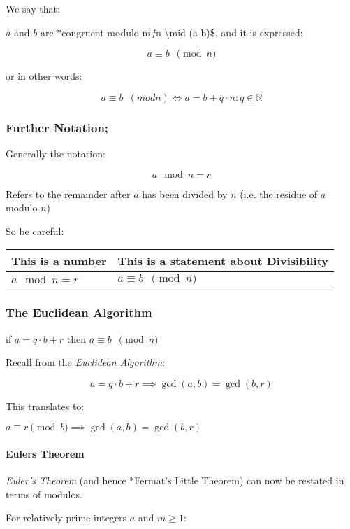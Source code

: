 \documentclass[
]{article}
\begin{document}
We say that:

\(a\) and \(b\) are *congruent modulo n\( if \)n \textbackslash mid
(a-b)\$, and it is expressed:

\[a\equiv b \enspace \pmod{n}\]

or in other words:

\[a\equiv b \enspace (mod n) \iff a = b + q\cdot n : q \in \mathbb{R}\]

\hypertarget{header-n414}{%
\subsubsection{Further Notation;}\label{header-n414}}

Generally the notation:

\[a \mod n = r\]

Refers to the remainder after \(a\) has been divided by \(n\) (i.e. the
residue of \(a\) modulo \(n\))

So be careful:

\begin{longtable}[]{@{}ll@{}}
\toprule
\textbf{This is a number} & \textbf{This is a statement about
Divisibility}\tabularnewline
\midrule
\endhead
\(a \mod n = r\) & \(a\equiv b \enspace \pmod{n}\)\tabularnewline
\bottomrule
\end{longtable}

\hypertarget{header-n426}{%
\subsubsection{The Euclidean Algorithm}\label{header-n426}}

if \(a = q\cdot b +r\) then \(a\equiv b \enspace \pmod{n}\)

Recall from the \emph{Euclidean Algorithm}:

\[a = q\cdot b +r \implies \gcd(a,b) = \gcd(b,r)\]

This translates to:

\(a \equiv r \pmod{b} \implies \gcd(a,b) = \gcd(b,r)\)

\hypertarget{header-n432}{%
\paragraph{Eulers Theorem}\label{header-n432}}

\emph{Euler's Theorem} (and hence *Fermat's Little Theorem) can now be
restated in terms of modulos.

For relatively prime integers \(a\) and \(m \geq 1\):
\end{document}
